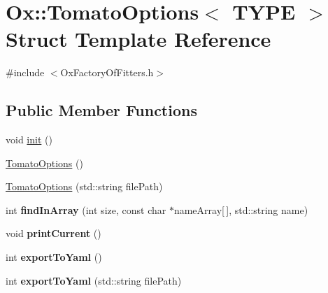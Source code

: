 \hypertarget{struct_ox_1_1_tomato_options}{\section{Ox\-:\-:Tomato\-Options$<$ T\-Y\-P\-E $>$ Struct Template Reference}
\label{struct_ox_1_1_tomato_options}
}


{\ttfamily \#include $<$Ox\-Factory\-Of\-Fitters.\-h$>$}

\subsection*{Public Member Functions}
\begin{DoxyCompactItemize}
\item 
void \hyperlink{struct_ox_1_1_tomato_options_a76497b53cadad720af7ff0f83b99096b}{init} ()
\item 
\hyperlink{struct_ox_1_1_tomato_options_a974a7659d7eaefe712b1bb00cbd46a93}{Tomato\-Options} ()
\item 
\hyperlink{struct_ox_1_1_tomato_options_abd502ef8966b09c671e2b7a5b565ce38}{Tomato\-Options} (std\-::string file\-Path)
\item 
\hypertarget{struct_ox_1_1_tomato_options_a9630620338003eb675fdfe242449c915}{int {\bfseries find\-In\-Array} (int size, const char $\ast$name\-Array\mbox{[}$\,$\mbox{]}, std\-::string name)}\label{struct_ox_1_1_tomato_options_a9630620338003eb675fdfe242449c915}

\item 
\hypertarget{struct_ox_1_1_tomato_options_ab50a9d1d7044fa64878b9b7141fd4c81}{void {\bfseries print\-Current} ()}\label{struct_ox_1_1_tomato_options_ab50a9d1d7044fa64878b9b7141fd4c81}

\item 
\hypertarget{struct_ox_1_1_tomato_options_a8c763b89efcc2122205363a7e743afa9}{int {\bfseries export\-To\-Yaml} ()}\label{struct_ox_1_1_tomato_options_a8c763b89efcc2122205363a7e743afa9}

\item 
\hypertarget{struct_ox_1_1_tomato_options_a858797a020bbb2504cfcf389bec9bca2}{int {\bfseries export\-To\-Yaml} (std\-::string file\-Path)}\label{struct_ox_1_1_tomato_options_a858797a020bbb2504cfcf389bec9bca2}

\end{DoxyCompactItemize}
